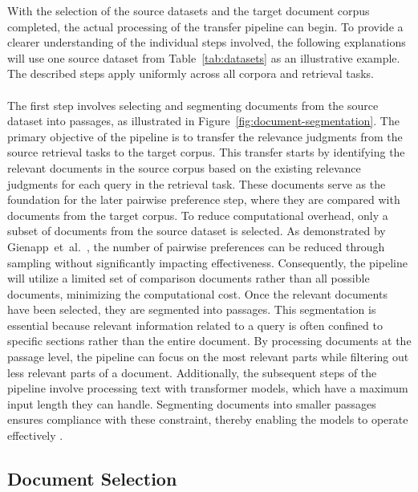 With the selection of the source datasets and the target document corpus \mbox{completed}, the actual processing of the transfer pipeline can begin. To \mbox{provide} a clearer understanding of the individual steps involved, the following explanations will use one source dataset from Table~\ref{tab:datasets} as an illustrative example. The described steps apply uniformly across all corpora and retrieval tasks.
\\\\
The first step involves selecting and segmenting documents from the source dataset into passages, as illustrated in Figure~\ref{fig:document-segmentation}. The primary objective of the pipeline is to transfer the relevance judgments from the source retrieval tasks to the target corpus. This transfer starts by identifying the relevant documents in the source corpus based on the existing relevance judgments for each query in the retrieval task. These documents serve as the foundation for the later pairwise preference step, where they are compared with documents from the target corpus. To reduce computational overhead, only a subset of documents from the source dataset is selected. As demonstrated by \mbox{Gienapp et al.~\cite{gienapp:2022}}, the number of pairwise preferences can be reduced through sampling without significantly impacting effectiveness. Consequently, the pipeline will utilize a limited set of comparison documents rather than all possible documents, minimizing the computational cost. Once the relevant documents have been selected, they are segmented into passages. This segmentation is essential because relevant information related to a query is often confined to specific sections rather than the entire document. By processing documents at the passage level, the pipeline can focus on the most relevant parts while filtering out less relevant parts of a document. Additionally, the subsequent steps of the pipeline involve processing text with transformer models, which have a maximum input length they can handle. Segmenting documents into smaller passages ensures compliance with these constraint, thereby enabling the models to operate effectively \cite{levy:2024}.

\subsection{Document Selection}\label{document-selection}

